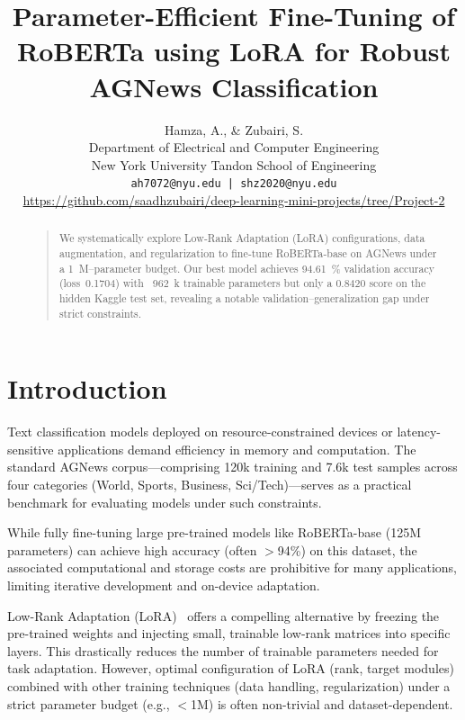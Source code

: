 \documentclass[letterpaper]{article}
\begin{document}
\title{Parameter-Efficient Fine-Tuning of RoBERTa using LoRA for Robust AGNews Classification}

\author{Hamza, A., \& Zubairi, S. \\
Department of Electrical and Computer Engineering\\
New York University Tandon School of Engineering\\
\texttt{ah7072@nyu.edu | shz2020@nyu.edu}\\
\url{https://github.com/saadhzubairi/deep-learning-mini-projects/tree/Project-2}\\
}
\maketitle

\begin{abstract}
    \begin{quote}
    We systematically explore Low‑Rank Adaptation (LoRA) configurations, data augmentation, and regularization to fine‑tune RoBERTa‑base on AGNews under a 1 M–parameter budget. Our best model achieves 94.61 \% validation accuracy (loss 0.1704) with ~962 k trainable parameters but only a 0.8420 score on the hidden Kaggle test set, revealing a notable validation–generalization gap under strict constraints.
    \end{quote}
    \end{abstract}

\section{Introduction}
Text classification models deployed on resource-constrained devices or latency-sensitive applications demand efficiency in memory and computation. The standard AGNews corpus—comprising 120k training and 7.6k test samples across four categories (World, Sports, Business, Sci/Tech)—serves as a practical benchmark for evaluating models under such constraints.

While fully fine-tuning large pre-trained models like RoBERTa-base (125M parameters) can achieve high accuracy (often $>$94\%) on this dataset, the associated computational and storage costs are prohibitive for many applications, limiting iterative development and on-device adaptation.

Low-Rank Adaptation (LoRA)~\cite{hu2022lora} offers a compelling alternative by freezing the pre-trained weights and injecting small, trainable low-rank matrices into specific layers. This drastically reduces the number of trainable parameters needed for task adaptation. However, optimal configuration of LoRA (rank, target modules) combined with other training techniques (data handling, regularization) under a strict parameter budget (e.g., $<$1M) is often non-trivial and dataset-dependent.
\end{document}
